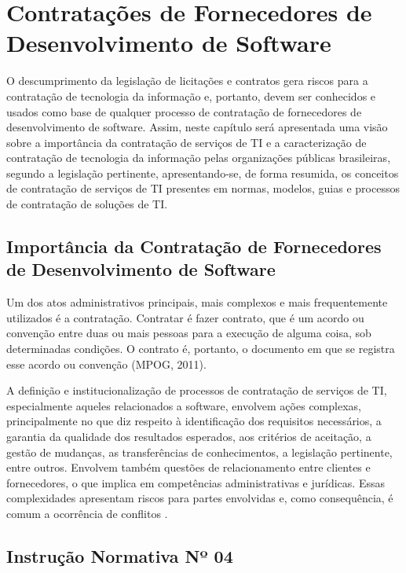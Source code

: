 \chapter{Contratações de Fornecedores de Desenvolvimento de Software}
\label{chap:contratos}

O descumprimento da legislação de licitações e contratos gera riscos para a contratação de tecnologia da informação e, portanto, devem ser conhecidos e usados como
base de qualquer processo de contratação de fornecedores de desenvolvimento de software.
Assim, neste capítulo será apresentada uma visão sobre a importância da contratação de
serviços de TI e a caracterização de contratação de tecnologia da informação pelas organizações públicas brasileiras, segundo a legislação pertinente, apresentando-se, de forma resumida, os conceitos de contratação de serviços de TI presentes em normas, modelos, guias e processos de contratação de soluções de TI.

\section{Importância da Contratação de Fornecedores de Desenvolvimento de Software}

Um dos atos administrativos principais, mais complexos e mais frequentemente
utilizados é a contratação. Contratar é fazer contrato, que é um acordo ou convenção
entre duas ou mais pessoas para a execução de alguma coisa, sob determinadas condições.
O contrato é, portanto, o documento em que se registra esse acordo ou convenção (MPOG,
2011).

A definição e institucionalização de processos de contratação de serviços de TI,
especialmente aqueles relacionados a software, envolvem ações complexas, principalmente
no que diz respeito à identificação dos requisitos necessários, a garantia da qualidade dos resultados esperados, aos critérios de aceitação, a gestão de mudanças, as transferências de conhecimentos, a legislação pertinente, entre outros. Envolvem também questões de relacionamento entre clientes e fornecedores, o que implica em competências administrativas e jurídicas. Essas complexidades apresentam riscos para partes envolvidas e, como consequência, é comum a ocorrência de conflitos \cite{processoContratacao}.


\section{Instrução Normativa Nº 04}

